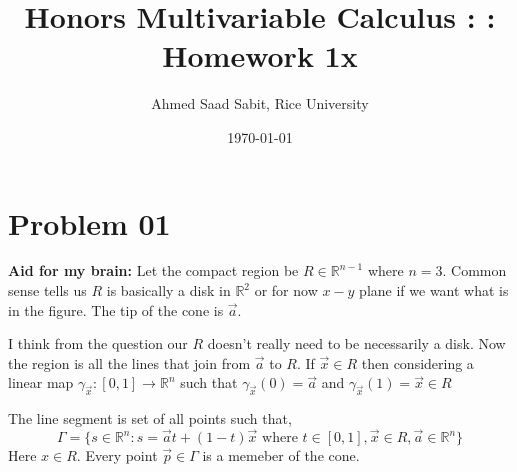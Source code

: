 \documentclass[letter]{article}
\title{Honors Multivariable Calculus : : Homework 1x}
\author{Ahmed Saad Sabit, Rice University}
\date{\today}
\begin{document}
\maketitle

\section*{Problem 01} 
\begin{tcolorbox}[colback=white, colframe=NordBlue, sharpish corners]
	\textbf{Aid for my brain: }
	Let the compact region be $R \in \mathbb{R}^{n-1}$ where $n = 3$. Common sense tells us $R$ is basically a disk in $\mathbb{R}^{2}$ or for now $x-y$ plane if we want what is in the figure. The tip of the cone is $\vec{a}$. 

	I think from the question our $R$ doesn't really need to be necessarily a disk. Now the region is all the lines that join from $\vec{a}$ to $R$. If $\vec{x} \in R$ then considering a linear map $\gamma_{\vec{x}}: [0,1] \to \mathbb{R}^{n} $ such that $\gamma_{\vec{x}}(0) = \vec{a}$ and $\gamma_{\vec{x}}(1) = \vec{x} \in R$ 

\begin{center}
\newcommand{\radiusx}{2}
\newcommand{\radiusy}{.5}
\newcommand{\height}{3}

\end{center} 
The line segment is set of all points such that, 
\[
	\Gamma = \{s \in \mathbb{R}^{n} : s = \vec{a} t + (1- t ) \vec{x} \text{ where } t \in  [0, 1], \vec{x} \in R, \vec{a} \in \mathbb{R}^{n}\} 
\]
Here $x \in  R$. Every point $\vec{p} \in \Gamma$ is a memeber of the cone.  
\end{tcolorbox}
\end{document}
